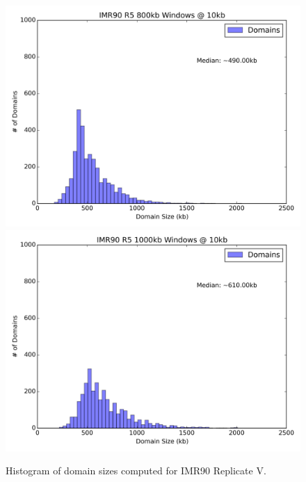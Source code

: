 \begin{figure}[H]
  \begin{minipage}{0.5\textwidth}%
    \includegraphics[width=\textwidth]{./figures/supplementary/domains/size800kb.png}
  \end{minipage}%
  \hfill
  \begin{minipage}{0.5\textwidth}
    \includegraphics[width=\textwidth]{./figures/supplementary/domains/size1000kb.png}
  \end{minipage}
  \small
  Histogram of domain sizes computed for IMR90 Replicate V.
\end{figure}

